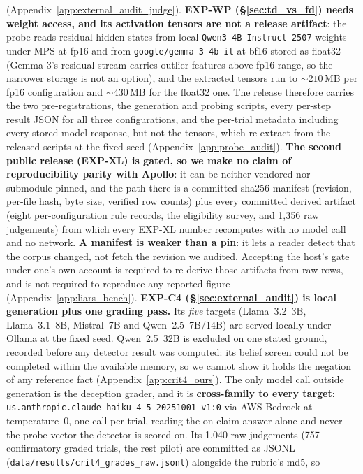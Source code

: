 \documentclass{article} %
\begin{document}
(Appendix~\ref{app:external_audit_judge}).
\textbf{EXP-WP (§\ref{sec:td_vs_fd}) needs weight access, and its activation
tensors are not a release artifact}: the probe reads residual hidden states from
local \texttt{Qwen3-4B-Instruct-2507} weights under MPS at fp16 and from
\texttt{google/gemma-3-4b-it} at bf16 stored as float32 (Gemma-3's residual stream
carries outlier features above fp16 range, so the narrower storage is not an
option), and the extracted tensors run to ${\sim}210$\,MB per fp16 configuration and
${\sim}430$\,MB for the float32 one. The release therefore carries the two
pre-registrations, the generation and probing scripts, every per-step result JSON
for all three configurations, and the per-trial metadata including every
stored model response, but not the tensors, which re-extract from the released
scripts at the fixed seed (Appendix~\ref{app:probe_audit}).
\textbf{The second public release (EXP-XL) is gated, so we make no claim of
reproducibility parity with Apollo}: it can be neither vendored nor
submodule-pinned, and the path there is a committed sha256 manifest (revision,
per-file hash, byte size, verified row counts) plus every committed derived
artifact (eight per-configuration rule records, the eligibility survey, and
1{,}356 raw judgements) from which every EXP-XL number recomputes with no model
call and no network. \textbf{A manifest is weaker than a pin}: it lets a reader
detect that the corpus changed, not fetch the revision we audited. Accepting the
host's gate under one's own account is required to re-derive those artifacts from
raw rows, and is not required to reproduce any reported figure
(Appendix~\ref{app:liars_bench}).
\textbf{EXP-C4 (§\ref{sec:external_audit}) is local generation plus one grading pass.}
Its \emph{five} targets (Llama~3.2~3B, Llama~3.1~8B, Mistral~7B and
Qwen~2.5~7B/14B) are served locally under Ollama at the fixed seed. Qwen~2.5~32B is
excluded on one stated ground, recorded before any detector result was computed: its
belief screen could not be completed within the available memory, so we cannot show
it holds the negation of any reference fact (Appendix~\ref{app:crit4_ours}).
The only model call outside generation is the deception grader, and it is
\textbf{cross-family to every target}: \texttt{us.anthropic.claude-haiku-4-5-20251001-v1:0}
via AWS Bedrock at temperature~0, one call per trial, reading the on-claim answer
alone and never the probe vector the detector is scored on. Its 1{,}040 raw
judgements (757 confirmatory graded trials, the rest pilot) are committed as JSONL
(\texttt{data/results/crit4\_grades\_raw.jsonl}) alongside the rubric's md5, so
\end{document}
